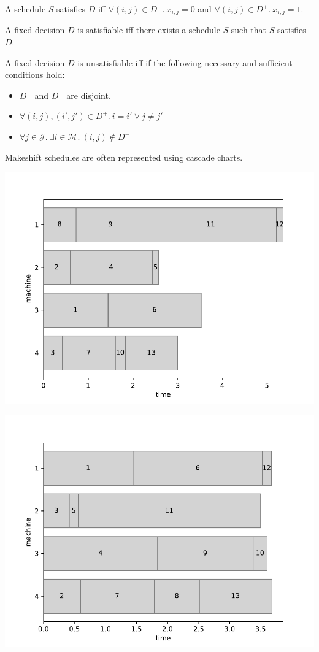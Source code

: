 \begin{definition}
	A schedule $S$ satisfies $D$ iff $\forall(i,j)\in D^-.\ x_{i,j}=0$ and $\forall (i,j)\in D^+.\ x_{i,j}=1$.
\end{definition}

\begin{definition}
	A fixed decision $D$ is satisfiable iff there exists a schedule $S$ such that $S$ satisfies $D$. 
\end{definition}

\begin{theorem}
	A fixed decision $D$ is unsatisfiable iff if the following necessary and sufficient conditions hold:
	\begin{itemize}
		\item$D^+$ and $D^-$ are disjoint.
		\item$\forall(i,j),(i',j')\in D^+.\ i=i'\lor j\neq j'$
		\item$\forall j\in\mathcal{J}.\ \exists i\in\mathcal{M}.\ (i,j)\not\in D^-$
	\end{itemize}
\end{theorem}

Makeshift schedules are often represented using cascade charts.

\begin{center}
	\includegraphics[width=.6\linewidth]{figures/makeshift1.pdf}
\end{center}

\begin{center}
	\includegraphics[width=.6\linewidth]{figures/makeshift2.pdf}	
\end{center}

